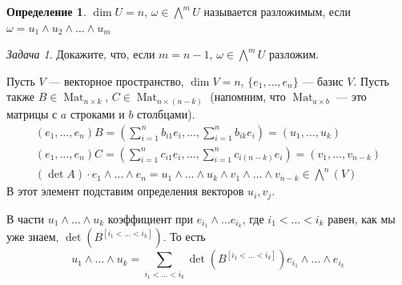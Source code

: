 \documentclass{article}
\theoremstyle{definition}
\newtheorem*{definition}{Определение}
\theoremstyle{remark}
\newtheorem{prb}{Задача}
\newenvironment{problem}
{\begin{prb}
\label{\theprb}}
{\end{prb}}
\DeclareMathOperator{\Mat}{Mat}
\begin{document}
\begin{definition}
$\dim U = n$, $\omega \in \bigwedge^m U$ называется разложимым, если $\omega = u_1 \wedge u_2 \wedge \ldots \wedge u_m$
\end{definition}

\begin{problem}
Докажите, что, если $m = n - 1$, $\omega \in \bigwedge^m U$ разложим.
\end{problem}

Пусть $V$ --- векторное пространство, $\dim V = n$, $\{e_1, \hdots, e_n\}$ --- базис $V$. Пусть также $B \in \Mat_{n \times k}$, $C \in \Mat_{n \times (n - k)}$ (напомним, что $\Mat_{a \times b}$ --- это матрицы с $a$ строками и $b$ столбцами).
\begin{gather*}
    (e_1, \hdots, e_n) B = \left( \sum_{i = 1}^{n} b_{i 1} e_i, \hdots, \sum_{i = 1}^{n} b_{i k} e_i \right) = (u_1, \hdots, u_k) \\
    (e_1, \hdots, e_n) C = \left( \sum_{i = 1}^{n} c_{i 1} e_i, \hdots, \sum_{i = 1}^{n} c_{i (n - k)} e_i \right) = (v_1, \hdots, v_{n-k}) \\
    (\det A) \cdot e_1 \wedge \hdots \wedge e_n = u_1 \wedge \hdots \wedge u_k \wedge v_1 \wedge \hdots \wedge v_{n-k} \in \bigwedge^n(V)
\end{gather*}
В этот элемент подставим определения векторов $u_i, v_j$.

В части $u_1 \wedge \hdots \wedge u_k$ коэффициент при $e_{i_1} \wedge \hdots e_{i_k}$, где $i_1 < \hdots < i_k$ равен, как мы уже знаем, $\det(B^{[i_1 < \hdots < i_k]})$. То есть
\begin{equation*}
    u_1 \wedge \hdots \wedge u_k = \sum_{i_1 < \hdots < i_k} \det(B^{[i_1 < \hdots < i_k]}) e_{i_1} \wedge \hdots \wedge e_{i_k}
\end{equation*}
\end{document}
